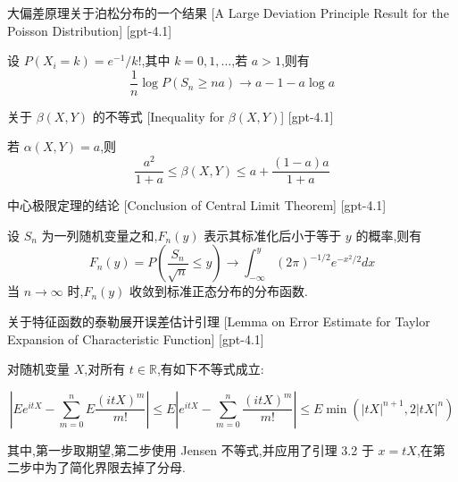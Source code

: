 \documentclass[UTF8]{ctexart}
\begin{document}
    
    
    \begin{thm}
        {大偏差原理关于泊松分布的一个结果}
        [A Large Deviation Principle Result for the Poisson Distribution]
        [gpt-4.1]
        
设 $P(X_i = k) = e^{-1} / k!$,其中 $k = 0, 1, \ldots$,若 $a > 1$,则有
\[
\frac{1}{n} \log P(S_n \geq n a) \to a - 1 - a \log a
\]

    \end{thm}
    
    
    
    \begin{thm}
        {关于 $\beta(X, Y)$ 的不等式}
        [Inequality for $\beta(X, Y)$]
        [gpt-4.1]
        
若 $\alpha(X, Y) = a$,则
\[
\frac{a^2}{1 + a} \leq \beta(X, Y) \leq a + \frac{(1 - a)a}{1 + a}
\]

    \end{thm}
    
    
    
    \begin{thm}
        {中心极限定理的结论}
        [Conclusion of Central Limit Theorem]
        [gpt-4.1]
        
设 $S_n$ 为一列随机变量之和,$F_n(y)$ 表示其标准化后小于等于 $y$ 的概率,则有
\[
F_{n}(y) = P\left(\frac{S_{n}}{\sqrt{n}} \leq y\right) \to \int_{-\infty}^{y} (2\pi)^{-1/2} e^{-x^{2}/2} dx
\]
当 $n \to \infty$ 时,$F_n(y)$ 收敛到标准正态分布的分布函数.

    \end{thm}
    
    
    
    \begin{lma}
        {关于特征函数的泰勒展开误差估计引理}
        [Lemma on Error Estimate for Taylor Expansion of Characteristic Function]
        [gpt-4.1]
        
对随机变量 $X$,对所有 $t \in \mathbb{R}$,有如下不等式成立:

\[
\left| E e^{itX} - \sum_{m=0}^n E \frac{(itX)^m}{m!} \right| \leq E \left| e^{itX} - \sum_{m=0}^n \frac{(itX)^m}{m!} \right| \leq E \min \left( |tX|^{n+1}, 2|tX|^n \right)
\]

其中,第一步取期望,第二步使用 Jensen 不等式,并应用了引理 3.2 于 $x = tX$,在第二步中为了简化界限去掉了分母.

    \end{lma}
    
\end{document}
